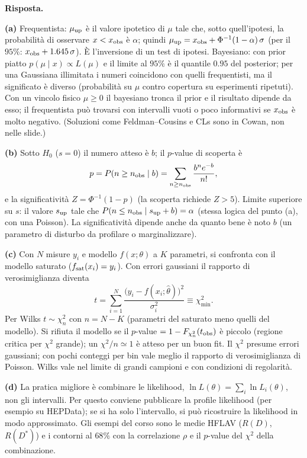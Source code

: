 \documentclass[11pt,a4paper]{article}
\newcommand{\Ris}[1]{\noindent\textbf{Risposta.}\par\nopagebreak #1}
\begin{document}
\Ris{
\textbf{(a)} Frequentista: $\mu_{\rm up}$ \`e il valore ipotetico di $\mu$ tale che, sotto quell'ipotesi, la probabilit\`a di osservare $x<x_{\rm obs}$ \`e $\alpha$; quindi $\mu_{\rm up}=x_{\rm obs}+\Phi^{-1}(1-\alpha)\,\sigma$ (per il $95\%$: $x_{\rm obs}+1.645\,\sigma$). \`E l'inversione di un test di ipotesi.
Bayesiano: con prior piatto $p(\mu\mid x)\propto L(\mu)$ e il limite al $95\%$ \`e il quantile $0.95$ del posterior; per una Gaussiana illimitata i numeri coincidono con quelli frequentisti, ma il significato \`e diverso (probabilit\`a su $\mu$ contro copertura su esperimenti ripetuti).
Con un vincolo fisico $\mu\ge0$ il bayesiano tronca il prior e il risultato dipende da esso; il frequentista pu\`o trovarsi con intervalli vuoti o poco informativi se $x_{\rm obs}$ \`e molto negativo. (Soluzioni come Feldman--Cousins e CLs sono in Cowan, non nelle slide.)

\textbf{(b)} Sotto $H_0$ ($s=0$) il numero atteso \`e $b$; il $p$-value di scoperta \`e
\[
p=P(n\ge n_{\rm obs}\mid b)=\sum_{n\ge n_{\rm obs}}\frac{b^ne^{-b}}{n!},
\]
e la significativit\`a $Z=\Phi^{-1}(1-p)$ (la scoperta richiede $Z>5$).
Limite superiore su $s$: il valore $s_{\rm up}$ tale che $P(n\le n_{\rm obs}\mid s_{\rm up}+b)=\alpha$ (stessa logica del punto (a), con una Poisson).
La significativit\`a dipende anche da quanto bene \`e noto $b$ (un parametro di disturbo da profilare o marginalizzare).

\textbf{(c)} Con $N$ misure $y_i$ e modello $f(x;\theta)$ a $K$ parametri, si confronta con il modello saturato ($f_{\rm sat}(x_i)=y_i$). Con errori gaussiani il rapporto di verosimiglianza diventa
\[
t=\sum_{i=1}^N\frac{\bigl(y_i-f(x_i;\hat\theta)\bigr)^2}{\sigma_i^2}\equiv\chi^2_{\min}.
\]
Per Wilks $t\sim\chi^2_n$ con $n=N-K$ (parametri del saturato meno quelli del modello). Si rifiuta il modello se il $p$-value $=1-F_{\chi^2_n}(t_{\rm obs})$ \`e piccolo (regione critica per $\chi^2$ grande); un $\chi^2/n\simeq1$ \`e atteso per un buon fit.
Il $\chi^2$ presume errori gaussiani; con pochi conteggi per bin vale meglio il rapporto di verosimiglianza di Poisson. Wilks vale nel limite di grandi campioni e con condizioni di regolarit\`a.

\textbf{(d)} La pratica migliore \`e combinare le likelihood, $\ln L(\theta)=\sum_i\ln L_i(\theta)$, non gli intervalli. Per questo conviene pubblicare la profile likelihood (per esempio su HEPData); se si ha solo l'intervallo, si pu\`o ricostruire la likelihood in modo approssimato. Gli esempi del corso sono le medie HFLAV ($R(D)$, $R(D^*)$) e i contorni al $68\%$ con la correlazione $\rho$ e il $p$-value del $\chi^2$ della combinazione.

}
\end{document}
